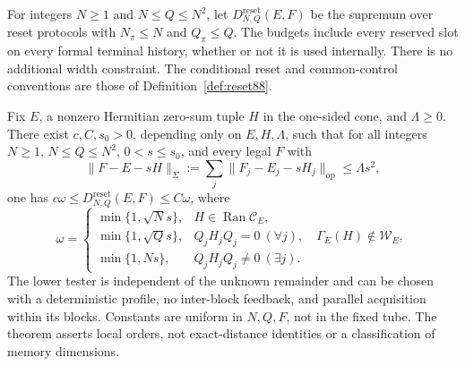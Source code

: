 \begin{definition}\label{def:quadraticbudget89}
For integers $N\ge1$ and $N\le Q\le N^2$, let
$D^{\mathrm{reset}}_{N,Q}(E,F)$ be the supremum over reset protocols
with $N_\pi\le N$ and $Q_\pi\le Q$.  The budgets include every
reserved slot on every formal terminal history, whether or not it is
used internally.  There is no additional width constraint.  The
conditional reset and common-control conventions are those of
Definition~\ref{def:reset88}.
\end{definition}

\begin{theorem}\label{thm:quadraticbudget89}
Fix $E$, a nonzero Hermitian zero-sum tuple $H$ in the one-sided cone,
and $\Lambda\ge0$.  There exist $c,C,s_0>0$, depending only on
$E,H,\Lambda$, such that for all integers $N\ge1$, $N\le Q\le N^2$,
$0<s\le s_0$, and every legal $F$ with
\[
 \|F-E-sH\|_\Sigma
 :=\sum_j\|F_j-E_j-sH_j\|_{\mathrm{op}}\le\Lambda s^2,
\]
one has $c\omega\le D^{\mathrm{reset}}_{N,Q}(E,F)\le C\omega$, where
\begin{equation}\label{eq:quadraticbudget89}
\omega=
\begin{cases}
 \min\{1,\sqrt N s\},&H\in\operatorname{Ran}\mathcal C_E,\\
 \min\{1,\sqrt Q s\},&Q_jH_jQ_j=0\ (\forall j),\quad
                           \Gamma_E(H)\notin\mathcal W_E,\\
 \min\{1,Ns\},&Q_jH_jQ_j\ne0\ (\exists j).
\end{cases}
\end{equation}
The lower tester is independent of the unknown remainder and can
be chosen with a deterministic profile, no inter-block feedback,
and parallel acquisition within its blocks.  Constants are uniform
in $N,Q,F$, not in the fixed tube.  The theorem asserts local orders,
not exact-distance identities or a classification of memory dimensions.
\end{theorem}

